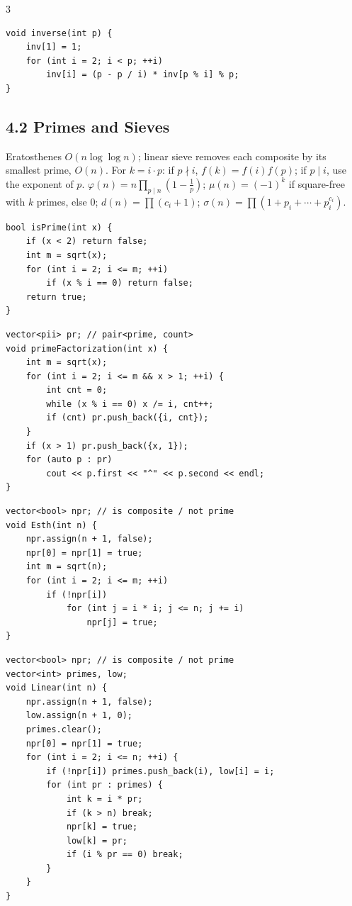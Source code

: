 \documentclass[8pt]{extarticle}
\begin{document}
\begin{multicols*}{3}
\begin{lstlisting}
void inverse(int p) {
    inv[1] = 1;
    for (int i = 2; i < p; ++i)
        inv[i] = (p - p / i) * inv[p % i] % p;
}
\end{lstlisting}

\subsection*{4.2 Primes and Sieves}

Eratosthenes $O(n \log\log n)$; linear sieve removes each composite by its smallest prime, $O(n)$. For $k = i \cdot p$: if $p \nmid i$, $f(k) = f(i) f(p)$; if $p \mid i$, use the exponent of $p$. $\varphi(n) = n \prod_{p \mid n}(1 - \frac1p)$; $\mu(n) = (-1)^k$ if square-free with $k$ primes, else $0$; $d(n) = \prod (c_i + 1)$; $\sigma(n) = \prod (1 + p_i + \cdots + p_i^{c_i})$.


\begin{lstlisting}
bool isPrime(int x) {
    if (x < 2) return false;
    int m = sqrt(x);
    for (int i = 2; i <= m; ++i)
        if (x % i == 0) return false;
    return true;
}
\end{lstlisting}

\begin{lstlisting}
vector<pii> pr; // pair<prime, count>
void primeFactorization(int x) {
    int m = sqrt(x);
    for (int i = 2; i <= m && x > 1; ++i) {
        int cnt = 0;
        while (x % i == 0) x /= i, cnt++;
        if (cnt) pr.push_back({i, cnt});
    }
    if (x > 1) pr.push_back({x, 1});
    for (auto p : pr)
        cout << p.first << "^" << p.second << endl;
}
\end{lstlisting}

\begin{lstlisting}
vector<bool> npr; // is composite / not prime
void Esth(int n) {
    npr.assign(n + 1, false);
    npr[0] = npr[1] = true;
    int m = sqrt(n);
    for (int i = 2; i <= m; ++i)
        if (!npr[i])
            for (int j = i * i; j <= n; j += i) 
                npr[j] = true;
}
\end{lstlisting}

\begin{lstlisting}
vector<bool> npr; // is composite / not prime
vector<int> primes, low;
void Linear(int n) {
    npr.assign(n + 1, false);
    low.assign(n + 1, 0);
    primes.clear();
    npr[0] = npr[1] = true;
    for (int i = 2; i <= n; ++i) {
        if (!npr[i]) primes.push_back(i), low[i] = i;
        for (int pr : primes) {
            int k = i * pr;
            if (k > n) break;
            npr[k] = true;
            low[k] = pr;
            if (i % pr == 0) break;
        }
    }
}
\end{lstlisting}


\end{multicols*}
\end{document}
